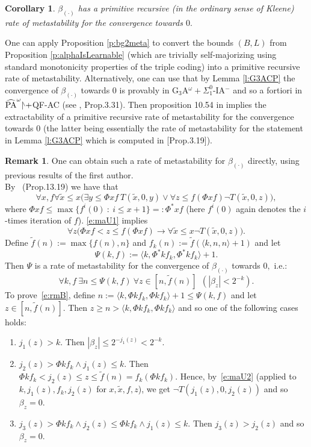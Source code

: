 \documentclass[1p]{elsarticle}
\newcommand{\res}{|\!\raisebox{1mm}{$\scriptscriptstyle\setminus$}}
\newcommand{\be}[1][{e:\arabic{equation}}] { \begin{equation}\label{#1} }
\newcommand{\ee} { \end{equation} }
\theoremstyle{plain}
\newtheorem{cor}[thm]{Corollary}
\theoremstyle{definition}
\newtheorem{rmk}[thm]{Remark}
\theoremstyle{remark}
\renewenvironment{proof}[1][]{\noindent{\bf Proof{#1}. }}{\nopagebreak[4]{\hspace*{\fill}
  $\Box$              %
 }{\vspace{2ex}}}
\theoremstyle{definition}
\begin{document}
{\begin{cor} \label{metastability-alpha}
$\beta_{(\cdot)}$ has a primitive recursive (in the ordinary sense 
of Kleene) rate of metastability for the convergence towards $0.$
\end{cor}
\begin{proof} One can apply Proposition \ref{p:bg2meta} to convert 
the bounds $(B,L)$ from Proposition \ref{p:alphaIsLearnable} (which are 
trivially self-majorizing using standard monotonicity properties of the 
triple coding) into a primitive 
recursive rate of metastability. Alternatively, one can use that by 
Lemma \ref{l:G3ACP} the convergence of $\beta_{(\cdot)}$ towards $0$ 
is provably in 
G$_3$A$^{\omega}+\Sigma^0_1$-IA$^-$ and so a fortiori  in 
$\widehat{\rm PA}^{\omega}\res+$QF-AC (see \cite{Kohlenbach(book)}, Prop.3.31).
Then proposition 10.54 in \cite{Kohlenbach(book)} implies the extractability 
of a primitive recursive rate of metastability for the convergence towards 
$0$ (the latter being essentially 
the rate of metastability for the statement in Lemma \ref{l:G3ACP} 
which is computed in \cite{Kohlenbach(book)}[Prop.3.19]).
\end{proof} 

\begin{rmk}\label{r:metaB}
One can obtain such a rate of metastability for $\beta_{(\cdot)}$ directly, using previous results
of the first author.\\
By~\cite{Kohlenbach(book)} (Prop.13.19) we have that
\be[e:maU1]
\forall x,f \forall \tilde x\leq x\big(\exists y\leq\Phi xf\ T(\tilde x,0,y)\vee \forall z\leq f(\Phi xf)\neg T(\tilde x,0,z)\big),
\ee
where $\Phi xf\leq \max\{f^{i}(0)\ 
:\ i\leq x+1\}=:\Phi^*xf$ (here $f^i(0)$ again denotes the 
$i$-times iteration of $f$). \eqref{e:maU1} implies
\be[e:maU2]
\forall z \big(\Phi xf< z\leq f(\Phi xf)\rightarrow \forall \tilde x \leq x \neg T(\tilde x,0,z)\big).
\ee
Define $\tilde f(n):=\max\{f(n),n\}$ and $f_k(n):=\tilde f(\langle k,n,n\rangle+1)$ and let
\[
\Psi(k,f):=\langle k,\Phi^*kf_k,\Phi^*kf_k\rangle + 1.
\]
Then $\Psi$ is a rate of metastability for the convergence of 
$\beta_{(\cdot)}$ towards $0,$ i.e.:
\be[e:rmB]
\forall k,f\ \exists n\leq \Psi(k,f)\ \forall z\in[n,\tilde f(n)]\ \ 
(|\beta_z|< 2^{-k}).
\ee
To prove~\eqref{e:rmB}, define $n:=\langle k, \Phi kf_k, \Phi kf_k\rangle+1\leq\Psi(k,f)$ and let $z\in[n,\tilde f(n)]$. Then 
$z\geq n > \langle k, \Phi kf_k, \Phi kf_k\rangle$ and so one of the following cases holds:
\hspace{35mm}\begin{enumerate}
\item $j_1(z)>k$. Then $|\beta_z|\leq2^{-j_1(z)}<2^{-k}$.
\item $j_2(z)>\Phi kf_k\wedge j_1(z)\leq k$. Then 
$
\Phi kf_k < j_2(z)\leq z \leq \tilde f(n)=f_k(\Phi kf_k).
$
Hence, by~\eqref{e:maU2} (applied to $k,j_1(z),f_k,j_2(z)$ 
for $x, \tilde{x}, f, z$), we get 
$\neg T(j_1(z),0,j_2(z))$ and so $\beta_z=0$.
\item $j_3(z)>\Phi kf_k\wedge j_2(z)\leq\Phi kf_k\wedge j_1(z)\leq k$. Then $j_3(z)>j_2(z)$ and so $\beta_z=0$.
\end{enumerate}
\end{rmk}


}
\end{document}
